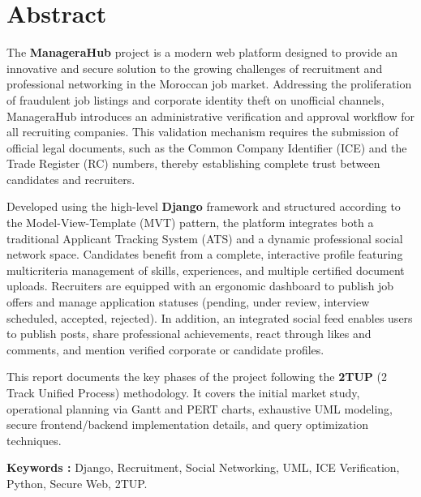 \newpage

\chapter*{Abstract}

The \textbf{ManageraHub} project is a modern web platform designed to provide an innovative and secure solution to the growing challenges of recruitment and professional networking in the Moroccan job market. Addressing the proliferation of fraudulent job listings and corporate identity theft on unofficial channels, ManageraHub introduces an administrative verification and approval workflow for all recruiting companies. This validation mechanism requires the submission of official legal documents, such as the Common Company Identifier (ICE) and the Trade Register (RC) numbers, thereby establishing complete trust between candidates and recruiters.

Developed using the high-level \textbf{Django} framework and structured according to the Model-View-Template (MVT) pattern, the platform integrates both a traditional Applicant Tracking System (ATS) and a dynamic professional social network space. Candidates benefit from a complete, interactive profile featuring multicriteria management of skills, experiences, and multiple certified document uploads. Recruiters are equipped with an ergonomic dashboard to publish job offers and manage application statuses (pending, under review, interview scheduled, accepted, rejected). In addition, an integrated social feed enables users to publish posts, share professional achievements, react through likes and comments, and mention verified corporate or candidate profiles.

This report documents the key phases of the project following the \textbf{2TUP} (2 Track Unified Process) methodology. It covers the initial market study, operational planning via Gantt and PERT charts, exhaustive UML modeling, secure frontend/backend implementation details, and query optimization techniques.

\vspace{0.5cm}
\noindent \textbf{Keywords :} Django, Recruitment, Social Networking, UML, ICE Verification, Python, Secure Web, 2TUP.
\newpage
